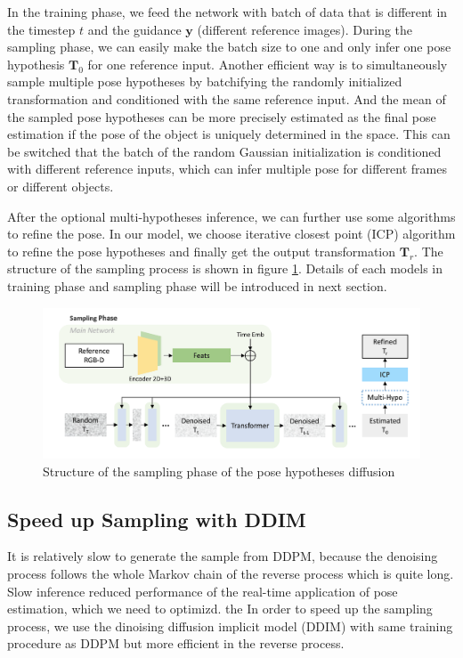 \documentclass[12pt,DIV14,BCOR12mm,a4paper,footinclude=false,headinclude,parskip=half-,twoside,openright,cleardoublepage=empty,toc=index,bibliography=totoc,listof=totoc]{scrreprt}
\numberwithin{equation}{chapter}
\begin{document}
In the training phase, we feed the network with batch of data that is different in the timestep $t$ and the guidance $\mathbf{y}$ (different reference images). During the sampling phase, we can easily make the batch size to one and only infer one pose hypothesis $\mathbf{T}_{0}$ for one reference input. Another efficient way is to simultaneously sample multiple pose hypotheses by batchifying the randomly initialized transformation and conditioned with the same reference input. And the mean of the sampled pose hypotheses can be more precisely estimated as the final pose estimation if the pose of the object is uniquely determined in the space. This can be switched that the batch of the random Gaussian initialization is conditioned with different reference inputs, which can infer multiple pose for different frames or different objects.

After the optional multi-hypotheses inference, we can further use some algorithms to refine the pose. In our model, we choose iterative closest point (ICP)\cite{121791} algorithm to refine the pose hypotheses and finally get the output transformation $\mathbf{T}_{r}$. The structure of the sampling process is shown in figure \ref{img:sample}. Details of each models in training phase and sampling phase will be introduced in next section.
\begin{figure}[h]
	\centering
	\includegraphics[scale=.23]{img/sample.png}
	\caption{Structure of the sampling phase of the pose hypotheses diffusion}
	\label{img:sample}
\end{figure}

\subsection{Speed up Sampling with DDIM}
It is relatively slow to generate the sample from DDPM, because the denoising process follows the whole Markov chain of the reverse process which is quite long. Slow inference reduced performance of the real-time application of pose estimation, which we need to optimizd. the In order to speed up the sampling process, we use the dinoising diffusion implicit model (DDIM)\cite{song2022denoising} with same training procedure as DDPM but more efficient in the reverse process.
\end{document}
